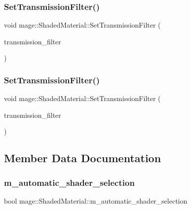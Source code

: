 \subsubsection{\texorpdfstring{Set\+Transmission\+Filter()}{SetTransmissionFilter()}\hspace{0.1cm}{\footnotesize\ttfamily [1/2]}}
{\footnotesize\ttfamily void mage\+::\+Shaded\+Material\+::\+Set\+Transmission\+Filter (\begin{DoxyParamCaption}\item[{const \hyperlink{structmage_1_1_r_g_b_spectrum}{R\+G\+B\+Spectrum} \&}]{transmission\+\_\+filter }\end{DoxyParamCaption})}

\hypertarget{structmage_1_1_shaded_material_a431b82b0149bda7229ba2d12123e4315}{}\label{structmage_1_1_shaded_material_a431b82b0149bda7229ba2d12123e4315} 
\subsubsection{\texorpdfstring{Set\+Transmission\+Filter()}{SetTransmissionFilter()}\hspace{0.1cm}{\footnotesize\ttfamily [2/2]}}
{\footnotesize\ttfamily void mage\+::\+Shaded\+Material\+::\+Set\+Transmission\+Filter (\begin{DoxyParamCaption}\item[{\hyperlink{structmage_1_1_r_g_b_spectrum}{R\+G\+B\+Spectrum} \&\&}]{transmission\+\_\+filter }\end{DoxyParamCaption})}



\subsection{Member Data Documentation}
\hypertarget{structmage_1_1_shaded_material_a744f6e4c0318f29f343039d6be072b66}{}\label{structmage_1_1_shaded_material_a744f6e4c0318f29f343039d6be072b66} 
\subsubsection{\texorpdfstring{m\+\_\+automatic\+\_\+shader\+\_\+selection}{m\_automatic\_shader\_selection}}
{\footnotesize\ttfamily bool mage\+::\+Shaded\+Material\+::m\+\_\+automatic\+\_\+shader\+\_\+selection\hspace{0.3cm}{\ttfamily [private]}}

